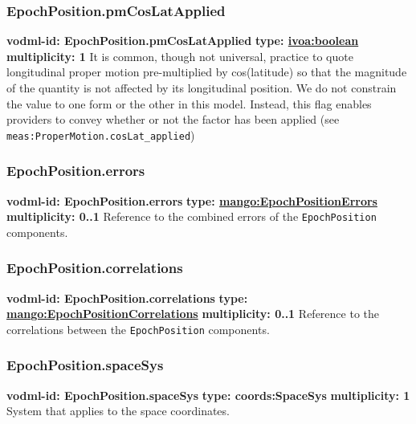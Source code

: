     \subsubsection{EpochPosition.pmCosLatApplied}
      \textbf{vodml-id: EpochPosition.pmCosLatApplied} \newline
      \textbf{type: \hyperref[sect:ivoa]{ivoa:boolean}} \newline
      \textbf{multiplicity: 1} \newline
      It is common, though not universal, practice to quote longitudinal proper motion pre-multiplied by cos(latitude) so that the magnitude of the quantity is not affected by its longitudinal position. We do not constrain the value to one form or the other in this model. Instead, this flag enables providers to convey whether or not the factor has been applied (see \texttt{meas:ProperMotion.cosLat\_applied})

    \subsubsection{EpochPosition.errors}
      \textbf{vodml-id: EpochPosition.errors} \newline
      \textbf{type: \hyperref[sect:EpochPositionErrors]{mango:EpochPositionErrors}} \newline
      \textbf{multiplicity: 0..1} \newline
      Reference to the combined errors of the \texttt{EpochPosition} components.

    \subsubsection{EpochPosition.correlations}
      \textbf{vodml-id: EpochPosition.correlations} \newline
      \textbf{type: \hyperref[sect:EpochPositionCorrelations]{mango:EpochPositionCorrelations}} \newline
      \textbf{multiplicity: 0..1} \newline
      Reference to the correlations between the \texttt{EpochPosition} components.

    \subsubsection{EpochPosition.spaceSys}
      \textbf{vodml-id: EpochPosition.spaceSys} \newline
      \textbf{type: coords:SpaceSys} \newline
      \textbf{multiplicity: 1} \newline
      System that applies to the space coordinates.

